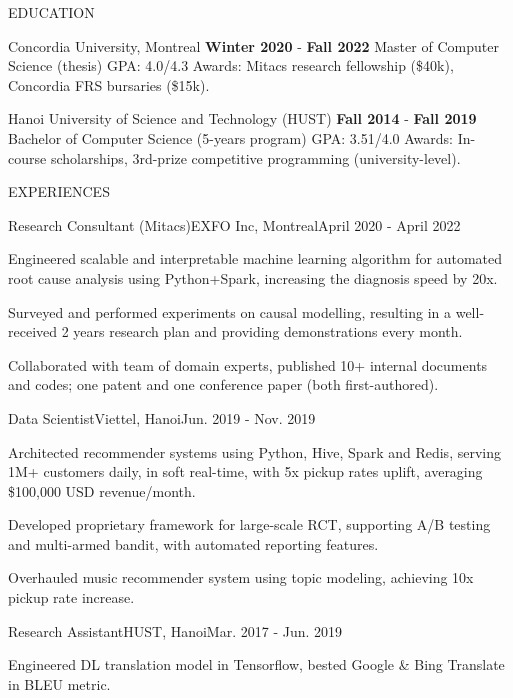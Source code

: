 \documentclass{resume} %
\begin{document}
\begin{rSection}{EDUCATION}
\begin{rSchool}{Concordia University, Montreal}
  {\textbf{Winter 2020} - \textbf{Fall 2022}}
  {Master of Computer Science ({thesis})}
  {GPA: 4.0/4.3}
  {Awards: Mitacs research fellowship (\$40k), Concordia FRS bursaries (\$15k).}
\end{rSchool}
%
\begin{rSchool}{Hanoi University of Science and Technology (HUST)}
  {\textbf{Fall 2014} - \textbf{Fall 2019}}
  {Bachelor of Computer Science ({5-years program})}
  {GPA: 3.51/4.0}
  {Awards: In-course scholarships, 3rd-prize competitive programming ({university-level}).}
\end{rSchool}
\end{rSection}
\begin{rSection}{EXPERIENCES}
\begin{rWork}{Research Consultant (Mitacs)}{EXFO Inc, Montreal}{April 2020 - April 2022}
  \item Engineered scalable and interpretable machine learning algorithm for automated root cause analysis using Python+Spark, increasing the diagnosis speed by 20x.
  \item Surveyed and performed experiments on causal modelling, resulting in a well-received 2 years research plan and providing demonstrations every month.
  \item Collaborated with team of domain experts, published 10+ internal documents and codes; one patent and one conference paper (both first-authored).
\end{rWork}
%
\begin{rWork}{Data Scientist}{Viettel, Hanoi}{Jun. 2019 - Nov. 2019}
  \item Architected recommender systems using Python, Hive, Spark and Redis, serving 1M+ customers daily, in soft real-time, with 5x pickup rates uplift, averaging \$100,000 USD revenue/month.
  \item Developed proprietary framework for large-scale RCT, supporting A/B testing and multi-armed bandit, with automated reporting features.
  \item Overhauled music recommender system using topic modeling, achieving 10x pickup rate increase.
\end{rWork}
%
\begin{rWork}{Research Assistant}{HUST, Hanoi}{Mar. 2017 - Jun. 2019}
  \item Engineered DL translation model in Tensorflow, bested Google \& Bing Translate in BLEU metric.

\end{rWork}
\end{rSection}
\end{document}
